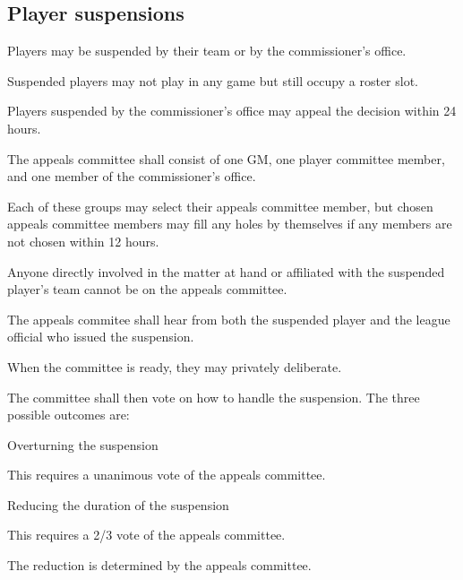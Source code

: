 \subsection{Player suspensions}
\begin{deepEnumerate}
	\item Players may be suspended by their team or by the commissioner's office.
	\begin{deepEnumerate}
		\item Suspended players may not play in any game but still occupy a roster slot.
	\end{deepEnumerate}
	\item Players suspended by the commissioner's office may appeal the decision within 24 hours.
	\begin{deepEnumerate}
		\item The appeals committee shall consist of 
		one GM, one player committee member, and one member of the commissioner's office.
		\begin{deepEnumerate}
			\item Each of these groups may select their appeals committee member, but chosen appeals committee members may fill any holes by themselves
			if any members are not chosen within 12 hours.
			\item Anyone directly involved in the matter at hand or affiliated with the suspended player's team	cannot be on the appeals committee.
		\end{deepEnumerate}
		\item The appeals commitee shall hear from both the suspended player and the league official who issued the suspension.
		\item When the committee is ready, they may privately deliberate.
		\item The committee shall then vote on how to handle the suspension. The three possible outcomes are:
		\begin{deepEnumerate}
			\item Overturning the suspension
			\begin{deepEnumerate}
				\item This requires a unanimous vote of the appeals committee.
			\end{deepEnumerate}
			\item Reducing the duration of the suspension
			\begin{deepEnumerate}
				\item This requires a 2/3 vote of the appeals committee.
				\item The reduction is determined by the appeals committee.

\end{deepEnumerate}
\end{deepEnumerate}
\end{deepEnumerate}
\end{deepEnumerate}
